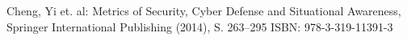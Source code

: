 
\begin{thebibliography}{8}
Cheng, Yi et. al: Metrics of Security, Cyber Defense and Situational Awareness, Springer International Publishing (2014), S. 263--295
ISBN: 978-3-319-11391-3
\end{thebibliography}
